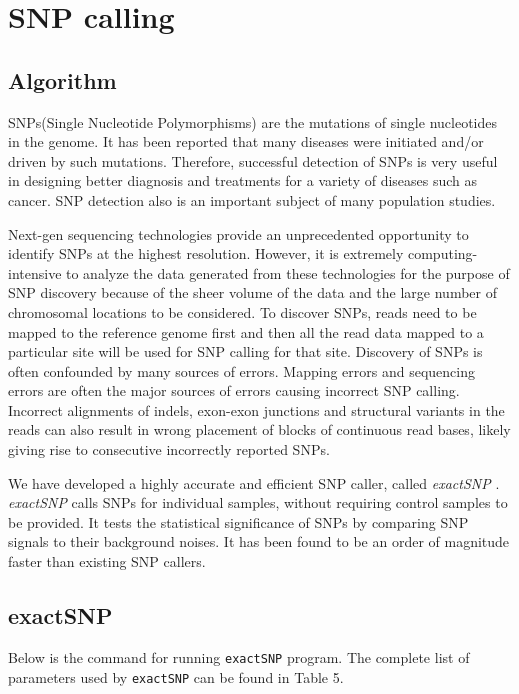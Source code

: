 \documentclass[12pt]{report}
\newcommand{\code}[1]{{\small\texttt{#1}}}
\begin{document}
\chapter{SNP calling}

\section{Algorithm}

SNPs(Single Nucleotide Polymorphisms) are the mutations of single nucleotides in the genome.
It has been reported that many diseases were initiated and/or driven by such mutations.
Therefore, successful detection of SNPs is very useful in designing better diagnosis and treatments for a variety of diseases such as cancer.
SNP detection also is an important subject of many population studies.

Next-gen sequencing technologies provide an unprecedented opportunity to identify SNPs at the highest resolution.
However, it is extremely computing-intensive to analyze the data generated from these technologies for the purpose of SNP discovery  because of the sheer volume of the data and the large number of chromosomal locations to be considered.
To discover SNPs, reads need to be mapped to the reference genome first and then all the read data mapped to a particular site will be used for SNP calling for that site.
Discovery of SNPs is often confounded by many sources of errors.
Mapping errors and sequencing errors are often the major sources of errors causing incorrect SNP calling.
Incorrect alignments of indels, exon-exon junctions and structural variants in the reads can also result in wrong placement of blocks of continuous read bases, likely giving rise to consecutive incorrectly reported SNPs.

We have developed a highly accurate and efficient SNP caller, called \emph{exactSNP} \cite{exactSNP}.
\emph{exactSNP} calls SNPs for individual samples, without requiring control samples to be provided.
It tests the statistical significance of SNPs by comparing SNP signals to their background noises.
It has been found to be an order of magnitude faster than existing SNP callers.

\section{exactSNP}

Below is the command for running \code{exactSNP} program.
The complete list of parameters used by \code{exactSNP} can be found in Table 5.\\
\end{document}
